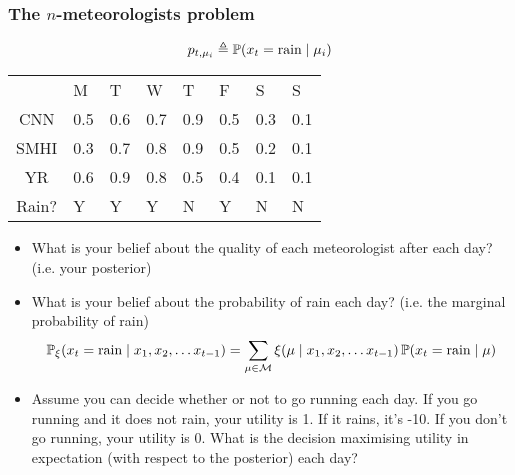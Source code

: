 \begin{frame}
  \frametitle{The $n$-meteorologists problem}
  \begin{exercise}
  \[
    p_{t,\mu_i} \mathrel{\triangleq}  \mathop{\mbox{\ensuremath{\mathbb{P}}}}\nolimits(x_t = \textrm{rain} \mid \mu_i) 
  \]
  \begin{table}[h]
    \begin{tabular}{c|l|l|l|l|l|l|l}
      &M&T&W&T&F&S&S\\
      CNN & 0.5 & 0.6 & 0.7 & 0.9 & 0.5 & 0.3 & 0.1\\
      SMHI & 0.3 & 0.7 & 0.8 & 0.9 & 0.5 & 0.2 & 0.1\\
      YR & 0.6 & 0.9 & 0.8 & 0.5 & 0.4 & 0.1 & 0.1\\
      \hline
      Rain? & Y & Y & Y & N & Y & N & N
    \end{tabular}
    \label{tab:meteorologists}
  \end{table}
  \begin{itemize}
  \item What is your belief about the quality of each meteorologist after each day? (i.e. your posterior)
  \item What is your belief about the probability of rain each day? (i.e. the marginal probability of rain)
    \[
      \mathop{\mbox{\ensuremath{\mathbb{P}}}}\nolimits_\xi(x_t = \textrm{rain} \mid x_1, x_2, \ldots x_{t-1})
      =
      \sum_{\mu \in {\mathcal{M}}} \xi(\mu \mid x_1, x_2, \ldots x_{t-1}) \mathop{\mbox{\ensuremath{\mathbb{P}}}}\nolimits(x_t = \textrm{rain} \mid \mu)
    \]
  \item Assume you can decide whether or not to go running each
    day. If you go running and it does not rain, your utility is 1. If
    it rains, it's -10. If you don't go running, your utility is
    0. What is the decision maximising utility in expectation (with respect to the posterior) each
    day?
  \end{itemize}
\end{exercise}
\end{frame}




